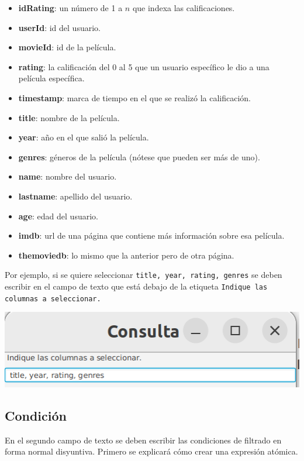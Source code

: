 \documentclass{article}
\begin{document}
\begin{itemize}
\item \textbf{idRating}: un número de 1 a $n$ que indexa las calificaciones.
\item \textbf{userId}: id del usuario.
\item \textbf{movieId}: id de la película.
\item \textbf{rating}: la calificación del 0 al 5 que un usuario específico le dio a una película específica.
\item \textbf{timestamp}: marca de tiempo en el que se realizó la calificación.
\item \textbf{title}: nombre de la película.
\item \textbf{year}: año en el que salió la película.
\item \textbf{genres}: géneros de la película (nótese que pueden ser más de uno).
\item \textbf{name}: nombre del usuario.
\item \textbf{lastname}: apellido del usuario.
\item \textbf{age}: edad del usuario.
\item \textbf{imdb}: url de una página que contiene más información sobre esa película.
\item \textbf{themoviedb}: lo mismo que la anterior pero de otra página.
\end{itemize}

Por ejemplo, si se quiere seleccionar \texttt{title, year, rating, genres} se deben escribir en el campo de texto que está debajo de la etiqueta \texttt{Indique las columnas a seleccionar.}

\includegraphics[width=\linewidth]{seleccion.png}

\subsection{Condición}

En el segundo campo de texto se deben escribir las condiciones de filtrado en forma normal disyuntiva. Primero se explicará cómo crear una expresión atómica.
\end{document}
